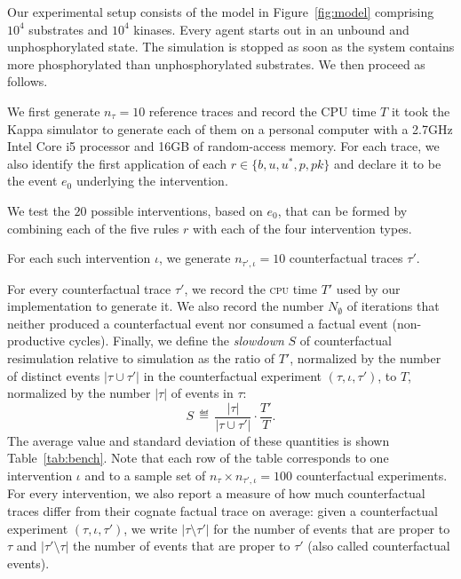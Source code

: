 Our experimental setup consists of the model in Figure~\ref{fig:model} comprising $10^4$ substrates and $10^4$ kinases. Every agent starts out in an unbound and unphosphorylated state. The simulation is stopped as soon as the system contains more phosphorylated than unphosphorylated substrates. We then proceed as follows.
\begin{inparaenum}[(i)]
\item We first generate $n_{\tau}=10$ reference traces and record the
  CPU time $T$ it took the Kappa simulator to generate each of them on
  a personal computer with a 2.7GHz Intel Core i5 processor and 16GB
  of random-access memory.  For each trace, we also identify the first
  application of each $r\in\{b,u,u^{\ast},p,pk\}$ and declare it to be
  the event $e_0$ underlying the intervention.
\item We test the $20$ possible
interventions, based on $e_0$, that can be formed by combining each of the five rules $r$ with each of the four intervention types.
\item For each such intervention $\iota$, we generate $n_{\tau',\iota} = 10$
  counterfactual traces $\tau'$.
\item For every counterfactual trace $\tau'$, we record 
 the \textsc{cpu} time $T'$ used by our implementation to generate it. We
also record the number $N_{\emptyset}$ of iterations that neither produced a
counterfactual event nor consumed a factual event (non-productive cycles).
Finally, we define the \textit{slowdown} $S$ of counterfactual resimulation
relative to simulation as the ratio of $T'$, normalized by the number of distinct events $|\tau \cup \tau'|$ in the counterfactual experiment $(\tau, \iota, \tau')$, to $T$, normalized by the number $|\tau|$ of events in
$\tau$:
\[ 
  S \,\eqdef\, \frac{|\tau|}{|\tau \cup \tau'|} \cdot\frac{T'}{T}. 
\] 
The average value and standard deviation of these quantities is shown
Table~\ref{tab:bench}. Note that each row of the table corresponds to one
intervention $\iota$ and to a sample set of $n_{\tau} \times n_{\tau',\iota} =
100$ counterfactual experiments. For every intervention, we also report a
measure of how much counterfactual traces differ from their cognate factual
trace on average: given a counterfactual experiment $(\tau, \iota, \tau')$, we
write $|\tau \!\setminus\! \tau'|$ for the number of events that are proper to
$\tau$ and $|\tau' \!\setminus\! \tau|$ the number of events that are proper to
$\tau'$ (also called counterfactual events). 
\end{inparaenum}

